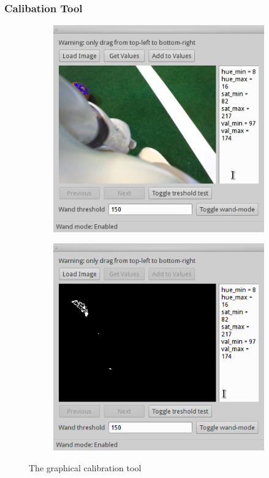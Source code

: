\documentclass[a4paper]{article}
\begin{document}
\subsubsection{Calibation Tool}
\begin{figure}[htbp]
    \centering
    \begin{subfigure}[b]{0.45\textwidth}
        \centering
        \includegraphics[width=\textwidth]{calibration_tool1.jpg}
    \end{subfigure}
    \begin{subfigure}[b]{0.45\textwidth}
        \centering
        \includegraphics[width=\textwidth]{calibration_tool2.png}
    \end{subfigure}
    \caption{The graphical calibration tool}
    \label{fig:calibrationtool}
\end{figure}
\end{document}
